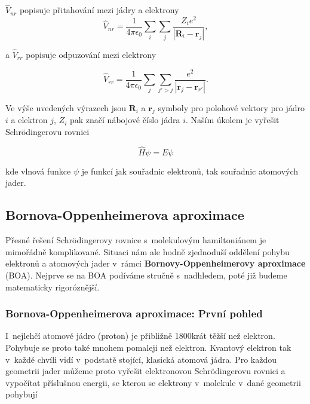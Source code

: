 \noindent $\hat{V}_{nr}$ popisuje přitahování mezi jádry a elektrony
\begin{equation}
\hat{V}_{nr}=\frac{1}{4\pi\epsilon_0}\sum_i\sum_j\frac{Z_i e^2}{ \left\vert \textbf{R}_i - \textbf{r}_j\right\vert } , 	
\end{equation}

\noindent a $\hat{V}_{rr}$ popisuje odpuzování mezi elektrony

\begin{equation}
\hat{V}_{rr}=\frac{1}{4\pi\epsilon_0}\sum_j\sum_{j'>j}\frac{ e^2}{ \left\vert \textbf{r}_j - \textbf{r}_{r'}\right\vert }. 	
\end{equation}

\noindent Ve výše uvedených výrazech jsou $\textbf{R}_i$ a $\textbf{r}_j$ symboly pro polohové vektory pro jádro $i$ a elektron $j$, $Z_i$ pak značí nábojové číslo jádra $i$. Naším úkolem je vyřešit Schrödingerovu rovnici

\begin{equation}
\hat{H}\psi=E\psi
\end{equation}

\noindent kde vlnová funkce $\psi$ je funkcí jak souřadnic elektronů, tak souřadnic atomových jader. 

\subsection{Bornova-Oppenheimerova aproximace}

Přesné řešení Schrödingerovy rovnice s~molekulovým hamiltoniánem je mimořádně komplikované. Situaci nám ale hodně zjednoduší oddělení pohybu elektronů a atomových jader v~rámci \textbf{Bornovy-Oppenheimerovy aproximace} (BOA). Nejprve se na BOA podíváme stručně s~nadhledem, poté již budeme matematicky rigoróznější. 

\subsubsection{Bornova-Oppenheimerova aproximace: První pohled}


I~nejlehčí atomové jádro (proton) je přibližně 1800krát těžší než elektron.  Pohybuje se proto také mnohem pomaleji než elektron. Kvantový elektron tak v~každé chvíli vidí v~podstatě stojící, klasická atomová jádra. Pro každou geometrii jader můžeme proto vyřešit elektronovou Schrödingerovu rovnici a vypočítat příslušnou energii, se kterou se elektrony v~molekule v~dané geometrii pohybují

